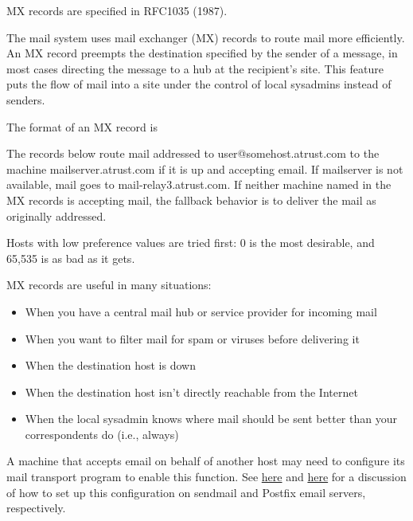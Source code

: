 \leavevmode\hypertarget{part0024_split_027.htmlux5cux23_idContainer953}{}%
MX records are specified in RFC1035 (1987).

\protect\hypertarget{part0024_split_027.htmlux5cux23_idIndexMarker2094}{}{}\protect\hypertarget{part0024_split_027.htmlux5cux23_idIndexMarker2095}{}{}The
mail system uses mail exchanger (MX) records to route mail more
efficiently. An MX record preempts the destination specified by the
sender of a message, in most cases directing the message to a hub at the
recipient's site. This feature puts the flow of mail into a site under
the control of local sysadmins instead of senders.

The format of an MX record is


The records below route mail addressed to user@somehost.atrust.com to
the machine mailserver.atrust.com if it is up and accepting email. If
mailserver is not available, mail goes to mail-relay3.atrust.com. If
neither machine named in the MX records is accepting mail, the fallback
behavior is to deliver the mail as originally addressed.


Hosts with low preference values are tried first: 0 is the most
desirable, and 65,535 is as bad as it gets.

MX records are useful in many situations:

\begin{itemize}
\tightlist
\item
  When you have a central mail hub or service provider for incoming mail
\item
  When you want to filter mail for spam or viruses before delivering it
\item
  When the destination host is down
\item
  When the destination host isn't directly reachable from the Internet
\item
  When the local sysadmin knows where mail should be sent better than
  your correspondents do (i.e., always)
\end{itemize}

A machine that accepts email on behalf of another host may need to
configure its mail transport program to enable this function. See
\protect\hyperlink{part0026_split_034.htmlux5cux23_idTextAnchor1073}{here}
and
\protect\hyperlink{part0026_split_062.htmlux5cux23_idTextAnchor1183}{here}
for a discussion of how to set up this configuration on {sendmail} and
Postfix email servers, respectively.

